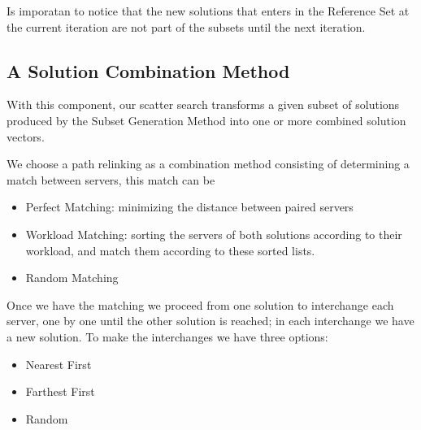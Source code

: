 Is imporatan to notice that
the new solutions that enters in the Reference Set
at the current iteration
are not part of the subsets
until the next iteration.

\subsection{A Solution Combination Method}
With this component,
our scatter search
transforms a given subset of solutions 
produced by the Subset Generation Method
into
one or more combined solution vectors.

We choose a path relinking as a combination method
consisting of
determining a match between servers,
this match can be
\begin{itemize}
\item Perfect Matching:
  minimizing the distance between paired servers
\item Workload Matching:
  sorting the servers of both solutions
  according to their workload,
  and match them according to these sorted lists.
\item Random Matching
\end{itemize}
Once we have the matching
we proceed from one solution
to interchange each server,
one by one
until the other solution is reached;
in each interchange
we have a new solution.
To make the interchanges
we have three options:
\begin{itemize}
\item Nearest First
\item Farthest First
\item Random
\end{itemize}

